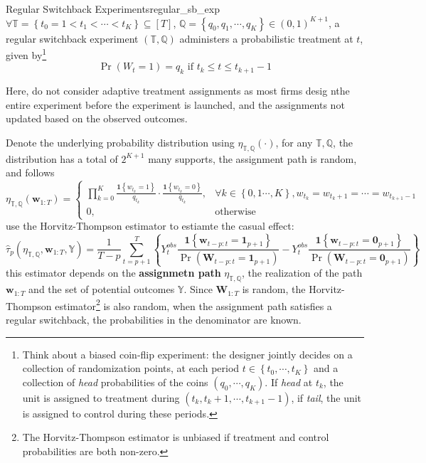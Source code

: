 \documentclass[twoside]{article}
\begin{document}
\begin{definition}{Regular Switchback Experiments}{regular_sb_exp}
    $\forall \mathbb{T}=\left\{t_0=1<t_1<\cdots<t_K\right\}\subseteq [T]$, $\mathbb{Q}=\left\{q_0,q_1,\cdots,q_K\right\}\in \left(0,1\right)^{K+1}$, a regular switchback experiment $\left(\mathbb{T,Q}\right)$ administers a probabilistic treatment at $t$, given by\footnote{Think about a biased coin-flip experiment: the designer jointly decides on a collection of randomization points, at each period $t\in\left\{t_0,\cdots,t_K\right\}$ and a collection of \textit{head} probabilities of the coins $\left(q_0,\cdots,q_K\right)$. If \textit{head} at $t_k$, the unit is assigned to treatment during $\left(t_k,t_k+1,\cdots,t_{k+1}-1\right)$, if \textit{tail}, the unit is assigned to control during these periods.}
    $$ \Pr\left(W_t=1\right)=q_k \text{ if }t_k\leq t\leq t_{k+1}-1 $$
\end{definition}
Here, \citet{bojinov2023design} do not consider adaptive treatment assignments as most firms desig nthe entire experiment before the experiment is launched, and the assignments not updated based on the observed outcomes.

Denote the underlying probability distribution using $\eta_{\mathbb{T,Q}}(\cdot)$, for any $\mathbb{T,Q}$, the distribution has a total of $2^{K+1}$ many supports, the assignment path is random, and follows 
\begin{equation*}
    \eta_{\mathbb{T,Q}}\left(\mathbf{w}_{1:T}\right) = \begin{cases}
        \prod^K_{k=0} \frac{\mathbf{1}\left\{w_{t_k}=1\right\}}{q_{t_k}}\cdot \frac{\mathbf{1}\left\{w_{t_k}=0\right\}}{\bar{q}_{t_k}}, & \forall k\in \left\{0,1\cdots,K\right\}, w_{t_k}=w_{t_k+1}=\cdots=w_{t_{k+1}-1} \\
        0, &\text{otherwise}
    \end{cases}
\end{equation*}
use the Horvitz-Thompson estimator to estiamte the casual effect:
\begin{equation}\label{eq:bojinov_htestimator}
    \hat{\tau}_p\left(\eta_{\mathbb{T,Q}},\mathbf{w}_{1:T},\mathbb{Y}\right) = \frac{1}{T-p} \sum^T_{t=p+1} \left\{ Y^{obs}_t \frac{\mathbf{1}\left\{\mathbf{w}_{t-p:t}=\mathbf{1}_{p+1}\right\}}{\Pr\left(\mathbf{W}_{t-p:t}=\mathbf{1}_{p+1}\right)} - Y^{obs}_t \frac{\mathbf{1}\left\{\mathbf{w}_{t-p:t}=\mathbf{0}_{p+1}\right\}}{\Pr\left(\mathbf{W}_{t-p:t}=\mathbf{0}_{p+1}\right)}  \right\}
\end{equation}
this estimator depends on the \textbf{assignmetn path} $\eta_{\mathbb{T,Q}}$, the realization of the path $\mathbf{w}_{1:T}$ and the set of potential outcomes $\mathbb{Y}$.
Since $\mathbf{W}_{1:T}$ is random, the Horvitz-Thompson estimator\footnote{The Horvitz-Thompson estimator is unbiased if treatment and control probabilities are both non-zero.} is also random, when the assignment path satisfies a regular switchback, the probabilities in the denominator are known.
\end{document}
